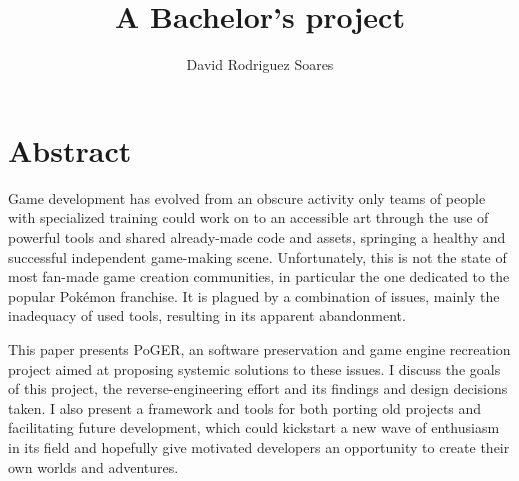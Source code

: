 \documentclass[11pt]{article}
\title{\vspace{15mm}{\HUGE PoGER}\\
	A Bachelor's project}
\author{David Rodriguez Soares}
\date{}
\begin{document}
\maketitle

\vfill
%
\section*{Abstract}

Game development has evolved from an obscure activity only teams of people with specialized training could work on to an accessible art through the use of powerful tools and shared already-made code and assets, springing a healthy and successful independent game-making scene. Unfortunately, this is not the state of most fan-made game creation communities, in particular the one dedicated to the popular Pokémon franchise. It is plagued by a combination of issues, mainly the inadequacy of used tools, resulting in its apparent abandonment.

This paper presents PoGER, an software preservation and game engine recreation project aimed at proposing systemic solutions to these issues. I discuss the goals of this project, the reverse-engineering effort and its findings and design decisions taken. I also present a framework and tools for both porting old projects and facilitating future development, which could kickstart a new wave of enthusiasm in its field and hopefully give motivated developers an opportunity to create their own worlds and adventures.


\newpage

\begingroup
\hypersetup{linkcolor=black}
\tableofcontents
\endgroup
%





\end{document}
